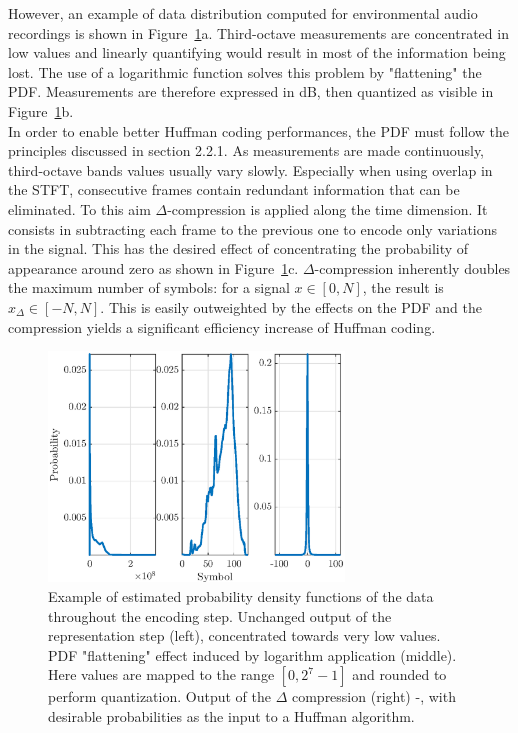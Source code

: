 \documentclass[12pt,times,onecolumn]{article}
\begin{document}
However, an example of data distribution computed for environmental audio recordings is shown in Figure~\ref{fig:pdf}a. Third-octave measurements are concentrated in low values and linearly quantifying would result in most of the information being lost. The use of a logarithmic function solves this problem by "flattening" the PDF. Measurements are therefore expressed in dB, then quantized as visible in Figure~\ref{fig:pdf}b.\\

In order to enable better Huffman coding performances, the PDF must follow the principles discussed in section 2.2.1. As measurements are made continuously, third-octave bands values usually vary slowly. Especially when using overlap in the STFT, consecutive frames contain redundant information that can be eliminated. To this aim $\Delta$-compression is applied along the time dimension. It consists in subtracting each frame to the previous one to encode only variations in the signal. This has the desired effect of concentrating the probability of appearance around zero as shown in Figure~\ref{fig:pdf}c. $\Delta$-compression inherently doubles the maximum number of symbols: for a signal $x\in [0, N]$, the result is $x_\Delta \in [-N, N]$. This is easily outweighted by the effects on the PDF and the compression yields a significant efficiency increase of Huffman coding.\\

\begin{figure}[htbp]
	\centering
		\includegraphics[width=0.7\textwidth]{figures/pdf.eps}
	\caption{Example of estimated probability density functions of the data throughout the encoding step. Unchanged output of the representation step (left), concentrated towards very low values. PDF "flattening" effect induced by logarithm application (middle). Here values are mapped to the range $[0, 2^7-1]$ and rounded to perform quantization. Output of the $\Delta$ compression (right) -, with desirable probabilities as the input to a Huffman algorithm.}
	\label{fig:pdf}
\end{figure}
\end{document}
